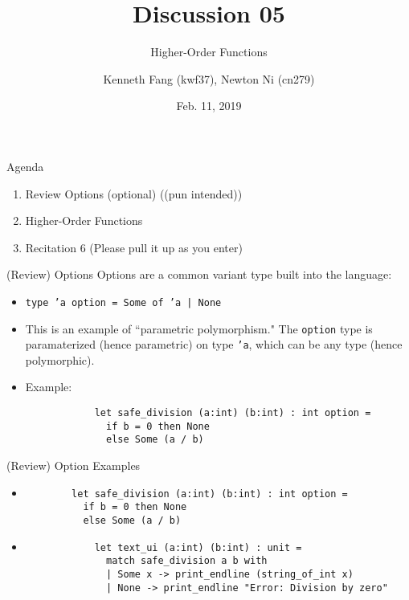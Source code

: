 \documentclass{beamer}
\title{Discussion 05}
\subtitle{Higher-Order Functions}
\author{Kenneth Fang (kwf37), Newton Ni (cn279)}
\date{Feb. 11, 2019}
\begin{document}
    \begin{frame}
        \titlepage{}
    \end{frame}
    
    \begin{frame}{Agenda}
    \begin{enumerate}
        \item Review Options (optional) ((pun intended))
        
        \item Higher-Order Functions
        
        \item Recitation 6 (Please pull it up as you enter)
    \end{enumerate}
    \end{frame}
    
    \begin{frame}[fragile]{(Review) Options}
        Options are a common variant type built into the language:
        \begin{itemize}
            \item \texttt{type 'a option = Some of 'a | None} \pause
            
            \item This is an example of ``parametric polymorphism." The \texttt{option} type is paramaterized (hence parametric) on type \texttt{'a}, which can be any type (hence polymorphic). \pause
            
            \item Example:
            \begin{verbatim}
            let safe_division (a:int) (b:int) : int option =
              if b = 0 then None
              else Some (a / b)
            \end{verbatim}
        \end{itemize}
    \end{frame}
    
    \begin{frame}[fragile]{(Review) Option Examples}
    \begin{itemize}
        \item 
        \begin{verbatim}
        let safe_division (a:int) (b:int) : int option =
          if b = 0 then None
          else Some (a / b)
        \end{verbatim}
        \item 
            \begin{verbatim}
            let text_ui (a:int) (b:int) : unit =
              match safe_division a b with
              | Some x -> print_endline (string_of_int x)
              | None -> print_endline "Error: Division by zero"
            \end{verbatim}
    \end{itemize}
    \end{frame}
    
\end{document}
